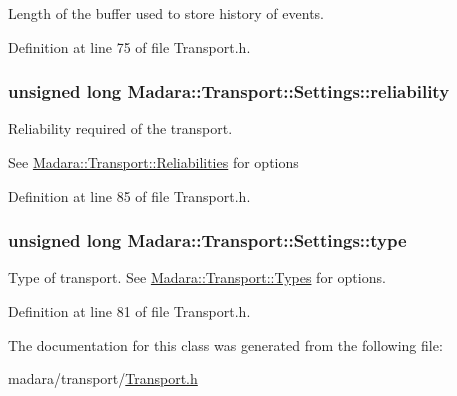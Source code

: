 Length of the buffer used to store history of events. 



Definition at line 75 of file Transport.h.

\hypertarget{classMadara_1_1Transport_1_1Settings_aacef2f9d64a4e8bec3e62a7ff539f217}{
\subsubsection[{reliability}]{\setlength{\rightskip}{0pt plus 5cm}unsigned long {\bf Madara::Transport::Settings::reliability}}}
\label{d1/d14/classMadara_1_1Transport_1_1Settings_aacef2f9d64a4e8bec3e62a7ff539f217}


Reliability required of the transport. 

See \hyperlink{namespaceMadara_1_1Transport_a8eede09c44edca44b766fa0ace76aba3}{Madara::Transport::Reliabilities} for options 

Definition at line 85 of file Transport.h.

\hypertarget{classMadara_1_1Transport_1_1Settings_aa2c6e7582dd1b3358fa754f3f5201e45}{
\subsubsection[{type}]{\setlength{\rightskip}{0pt plus 5cm}unsigned long {\bf Madara::Transport::Settings::type}}}
\label{d1/d14/classMadara_1_1Transport_1_1Settings_aa2c6e7582dd1b3358fa754f3f5201e45}


Type of transport. See \hyperlink{namespaceMadara_1_1Transport_a280656de18d1bbe4a165cd9fdd654ba5}{Madara::Transport::Types} for options. 



Definition at line 81 of file Transport.h.



The documentation for this class was generated from the following file:\begin{DoxyCompactItemize}
\item 
madara/transport/\hyperlink{Transport_8h}{Transport.h}\end{DoxyCompactItemize}
